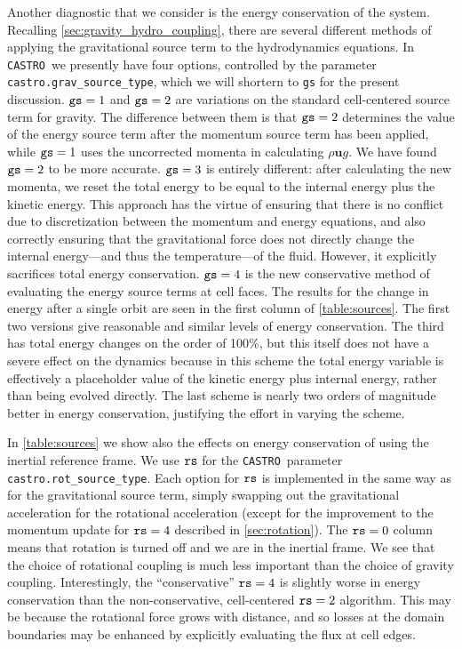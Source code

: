 \documentclass[iop]{../emulateapj}
\newcommand{\castro}{\texttt{CASTRO}}
\begin{document}
Another diagnostic that we consider is the energy conservation of the
system. Recalling \autoref{sec:gravity_hydro_coupling}, there are
several different methods of applying the gravitational source term to
the hydrodynamics equations. In \castro\ we presently have four
options, controlled by the parameter {\tt castro.grav\_source\_type},
which we will shortern to {\tt gs} for the present discussion. 
${\tt gs} = 1$ and ${\tt gs} = 2$ are variations on the standard 
cell-centered source term for gravity. The difference between them is that 
${\tt gs} = 2$ determines the value of the energy source term after the momentum
source term has been applied, while ${\tt gs} = 1$ uses the uncorrected
momenta in calculating $\rho \mathbf{u} g$. We have found ${\tt gs} = 2$ to be
more accurate. ${\tt gs} = 3$ is entirely different: after calculating
the new momenta, we reset the total energy to be equal to the internal
energy plus the kinetic energy. This approach has the virtue of ensuring that
there is no conflict due to discretization between the momentum and
energy equations, and also correctly ensuring that the gravitational
force does not directly change the internal energy---and thus the
temperature---of the fluid. However, it explicitly sacrifices total
energy conservation. ${\tt gs} = 4$ is the new conservative method of
evaluating the energy source terms at cell faces. The results for the
change in energy after a single orbit are seen in the first column of
\autoref{table:sources}. The first two versions give reasonable and
similar levels of energy conservation. The third has total energy
changes on the order of 100\%, but this itself does not have a severe
effect on the dynamics because in this scheme the total energy
variable is effectively a placeholder value of the kinetic energy plus
internal energy, rather than being evolved directly. The last scheme
is nearly two orders of magnitude better in energy conservation,
justifying the effort in varying the scheme.

In \autoref{table:sources} we show also the effects on energy conservation of using the inertial reference frame. 
We use ${\tt rs}$ for the \castro\ parameter {\tt castro.rot\_source\_type}.
Each option for ${\tt rs}$ is implemented in the same way as for
the gravitational source term, simply swapping out the gravitational acceleration
for the rotational acceleration (except for the improvement to the momentum update
for ${\tt rs} = 4$ described in \autoref{sec:rotation}). 
The ${\tt rs} = 0$ column means that rotation is turned off and we are 
in the inertial frame. We see that the choice of rotational coupling is much less important than the choice of gravity coupling. 
Interestingly, the ``conservative'' ${\tt rs} = 4$ is slightly worse in energy conservation than the non-conservative, 
cell-centered ${\tt rs} = 2$ algorithm. This may be because the rotational force grows with distance, and so losses at the 
domain boundaries may be enhanced by explicitly evaluating the flux at cell edges.
\end{document}
